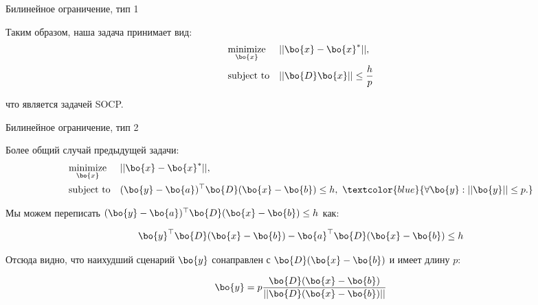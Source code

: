 \documentclass{beamer}
\begin{document}
\begin{frame}{Билинейное ограничение, тип 1}
	\begin{flushleft}
		
		Таким образом, наша задача принимает вид:
		\begin{equation}
			\begin{aligned}
				& \underset{\bo{x}}{\text{minimize}}
				& & ||\bo{x} - \bo{x}^*||, \\
				& \text{subject to}
				& & || \bo{D} \bo{x} || \leq \frac{h}{p}
			\end{aligned}
		\end{equation}
		
		что является задачей SOCP.
		
	\end{flushleft}
\end{frame}

\begin{frame}{Билинейное ограничение, тип 2}
	\begin{flushleft}
		
		Более общий случай предыдущей задачи:
		\begin{equation}
			\begin{aligned}
				& \underset{\bo{x}}{\text{minimize}} 
				& & ||\bo{x} - \bo{x}^*||, \\
				& \text{subject to}
				& & (\bo{y} - \bo{a})^\top \bo{D} (\bo{x} - \bo{b}) \leq h, \ 
				\textcolor{blue}{
					\forall \bo{y} :  ||\bo{y}|| \leq p.} 
			\end{aligned}
		\end{equation}
		
		Мы можем переписать $(\bo{y} - \bo{a})^\top \bo{D} (\bo{x} - \bo{b}) \leq h$ как:
		
		\begin{equation}
			\bo{y}^\top \bo{D} (\bo{x} - \bo{b}) - \bo{a}^\top \bo{D} (\bo{x} - \bo{b}) \leq h
		\end{equation}
		
		Отсюда видно, что наихудший сценарий $\bo{y}$ сонаправлен с $\bo{D} (\bo{x} - \bo{b})$ и имеет длину $p$:
		
		\begin{equation}
			\bo{y} = p \frac{\bo{D} (\bo{x} - \bo{b})}{|| \bo{D} (\bo{x} - \bo{b}) ||}
		\end{equation}
		
		
	\end{flushleft}
\end{frame}
\end{document}

